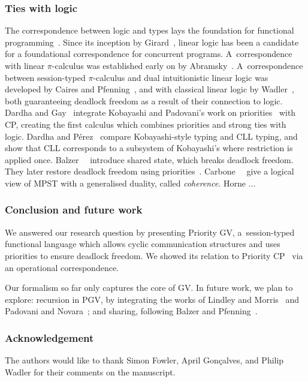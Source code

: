 \documentclass[main.tex]{subfiles}
\begin{document}
\subsubsection*{Ties with logic}
The correspondence between logic and types lays the foundation for functional programming~\cite{wadler15}. Since its inception by Girard~\cite{girard87}, linear logic has been a candidate for a foundational correspondence for concurrent programs. A~correspondence with linear $\pi$-calculus was established early on by Abramsky~\cite{abramsky94,bellinscott94}. A~correspondence between session-typed $\pi$-calculus and dual intuitionistic linear logic was developed by Caires and Pfenning~\cite[$\pi\text{DILL}$]{cairespfenning10}, and with classical linear logic by Wadler~\cite[CP]{wadler15}, both guaranteeing deadlock freedom as a result of their connection to logic. Dardha and Gay~\cite[PCP]{dardhagay18} integrate Kobayashi and Padovani's work on priorities~\cite{kobayashi06,padovani14} with CP, creating the first calculus which combines priorities and strong ties with logic. Dardha and P\'{e}rez~\cite{dardhaperez15} compare Kobayashi-style typing and CLL typing, and show that CLL corresponds to a subsystem of Kobayashi's where restriction is applied once. Balzer~\etal~\cite[$\text{SILL}_S$]{balzerpfenning17} introduce shared state, which breaks deadlock freedom. They later restore deadlock freedom using priorities~\cite[$\text{SILL}_{S+}$]{balzertoninho19}.
Carbone~\etal~\cite{CarboneMSY15,carbonelindley16} give a logical view of MPST with a generalised duality, called \emph{coherence}.
Horne \cite{Horne20} ...

\subsubsection*{Conclusion and future work}
We answered our research question by presenting Priority GV, a~session-typed functional language which allows cyclic communication structures and uses priorities to ensure deadlock freedom. We showed its relation to Priority CP~\cite{dardhagay18} via an operational correspondence.

Our formalism so far only captures the core of GV. In future work, we plan to explore: recursion in PGV, by integrating the works of Lindley and Morris~\cite{lindleymorris16} and Padovani and Novara~\cite{padovaninovara15}; %
and sharing, following Balzer and Pfenning~\cite{balzerpfenning17}.

\subsubsection*{Acknowledgement}
The authors would like to thank Simon Fowler, April Gon\c{c}alves, and Philip Wadler for their comments on the manuscript.
\end{document}

